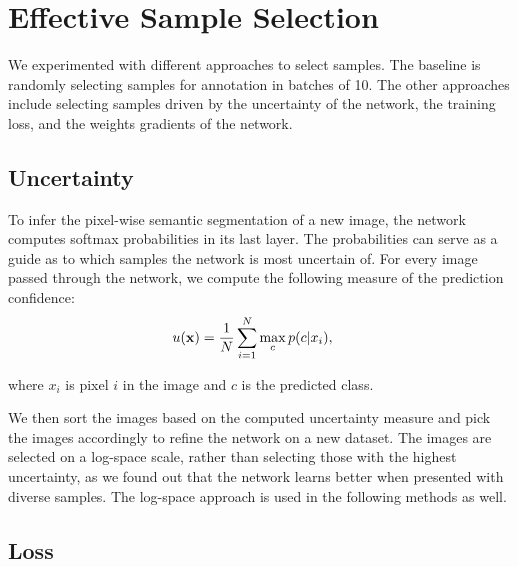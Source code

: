 \documentclass[letterpaper, 10 pt, conference]{ieeeconf}  %
\begin{document}
%
%
%
%
%
%


\section{Effective Sample Selection}

We experimented with different approaches to select samples. The baseline is randomly selecting samples for annotation in batches of 10. The other approaches include selecting samples driven by the uncertainty of the network, the training loss, and the weights gradients of the network.   


\subsection{Uncertainty}

To infer the pixel-wise semantic segmentation of a new image, the network computes softmax probabilities in its last layer. The probabilities can serve as a guide as to which samples the network is most uncertain of. For every image passed through the network, we compute the following measure of the prediction confidence:
\begin{align}
u(\bold{x}) &= \frac{1}{N} \sum_{i=1}^N \max_c p(c|x_i),
\end{align}  

where $x_i$ is pixel $i$ in the image and $c$ is the predicted class.

We then sort the images based on the computed uncertainty measure and pick the images accordingly to refine the network on a new dataset. The images are selected on a log-space scale, rather than selecting those with the highest uncertainty, as we found out that the network learns better when presented with diverse samples. The log-space approach is used in the following methods as well.

\subsection{Loss} \label{sec:loss}
\end{document}
